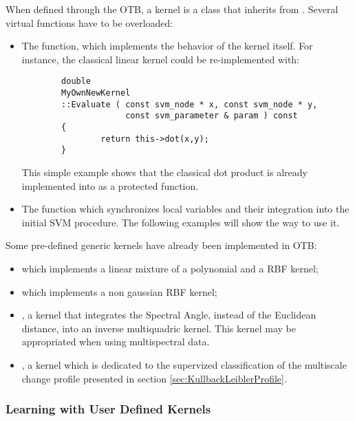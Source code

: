 When defined through the OTB, a kernel is a class that inherits from
. Several virtual functions have to 
be overloaded:
\begin{itemize}
\item The  function, which implements the behavior of the 
kernel
itself. For instance, the classical linear kernel could be re-implemented
with:
\begin{verbatim}
        double
        MyOwnNewKernel
        ::Evaluate ( const svm_node * x, const svm_node * y,
                     const svm_parameter & param ) const
        {
                return this->dot(x,y);
        }
\end{verbatim}
This simple example shows that the classical dot product is already 
implemented
into  as a protected
function.
\item The  function which synchronizes local variables and 
their
integration into the initial SVM procedure. The following examples will show
the way to use it.
\end{itemize}

Some pre-defined generic kernels have already been implemented in OTB:
\begin{itemize}
\item {} which implements a 
linear mixture
of a polynomial and a RBF kernel;
\item {} which implements a non
gaussian RBF kernel;
\item {}, a kernel that integrates
the Spectral Angle, instead of the Euclidean distance, into an inverse 
multiquadric kernel.
This kernel may be appropriated when using multispectral data.
\item {}, a kernel which is
dedicated to the supervized classification of the multiscale change profile
presented in section \ref{sec:KullbackLeiblerProfile}.
\end{itemize}

\subsubsection{Learning with User Defined Kernels}
\label{sec:Learningwithuserdefinedkernel}
\ifitkFullVersion

\fi

